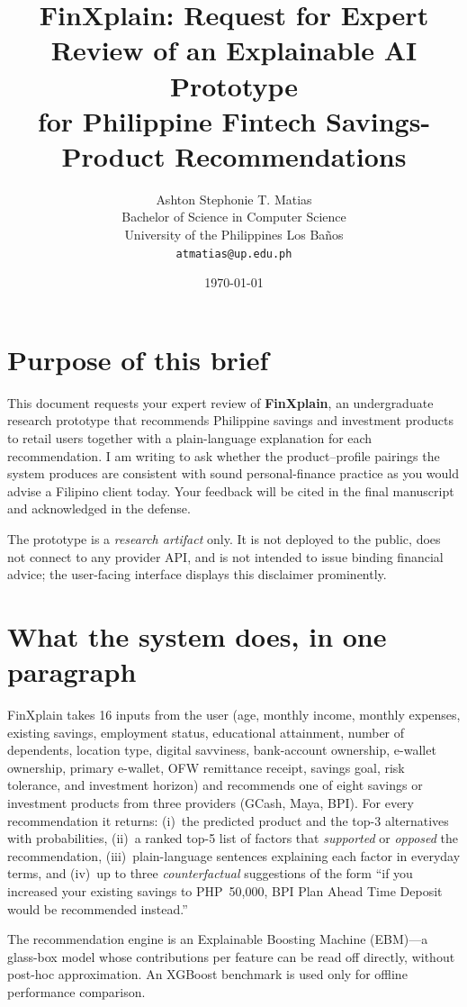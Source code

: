 \documentclass[11pt,a4paper]{article}
\title{\Large FinXplain: Request for Expert Review of an Explainable AI Prototype \\[2pt]
       \large for Philippine Fintech Savings-Product Recommendations}
\author{Ashton Stephonie T. Matias \\
        Bachelor of Science in Computer Science \\
        University of the Philippines Los Ba\~{n}os \\
        \texttt{atmatias@up.edu.ph}}
\date{\today}
\begin{document}
\maketitle
\thispagestyle{empty}

\section*{Purpose of this brief}

This document requests your expert review of \textbf{FinXplain}, an undergraduate
research prototype that recommends Philippine savings and investment products
to retail users together with a plain-language explanation for each
recommendation. I am writing to ask whether the product--profile pairings the
system produces are consistent with sound personal-finance practice as you
would advise a Filipino client today. Your feedback will be cited in the final
manuscript and acknowledged in the defense.

The prototype is a \emph{research artifact} only. It is not deployed to the
public, does not connect to any provider API, and is not intended to issue
binding financial advice; the user-facing interface displays this disclaimer
prominently.

\section*{What the system does, in one paragraph}

FinXplain takes 16 inputs from the user (age, monthly income, monthly
expenses, existing savings, employment status, educational attainment, number
of dependents, location type, digital savviness, bank-account ownership,
e-wallet ownership, primary e-wallet, OFW remittance receipt, savings goal,
risk tolerance, and investment horizon) and recommends one of eight savings
or investment products from three providers (GCash, Maya, BPI). For every
recommendation it returns: (i)~the predicted product and the top-3
alternatives with probabilities, (ii)~a ranked top-5 list of factors that
\emph{supported} or \emph{opposed} the recommendation, (iii)~plain-language
sentences explaining each factor in everyday terms, and (iv)~up to three
\emph{counterfactual} suggestions of the form ``if you increased your
existing savings to PHP~50{,}000, BPI Plan Ahead Time Deposit would be
recommended instead.''

The recommendation engine is an Explainable Boosting Machine (EBM)---a
glass-box model whose contributions per feature can be read off directly,
without post-hoc approximation. An XGBoost benchmark is used only for
offline performance comparison.
\end{document}
